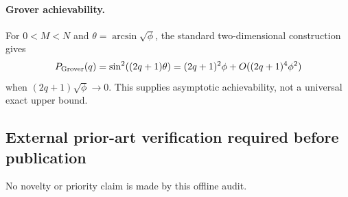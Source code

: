 \paragraph{Grover achievability.}
For $0<M<N$ and $\theta=\arcsin\sqrt\phi$, the standard two-dimensional
construction gives
\[
 P_{\rm Grover}(q)=\sin^2((2q+1)\theta)
 =(2q+1)^2\phi+O((2q+1)^4\phi^2)
\]
when $(2q+1)\sqrt\phi\to0$.  This supplies asymptotic achievability, not a
universal exact upper bound.

\subsection*{External prior-art verification required before publication}
No novelty or priority claim is made by this offline audit.
